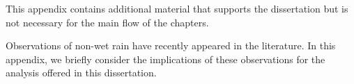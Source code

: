 This appendix contains additional material that supports the dissertation
but is not necessary for the main flow of the chapters.

Observations of non-wet rain have recently appeared in the literature.
In this appendix, we briefly consider the implications of these observations
for the analysis offered in this dissertation.